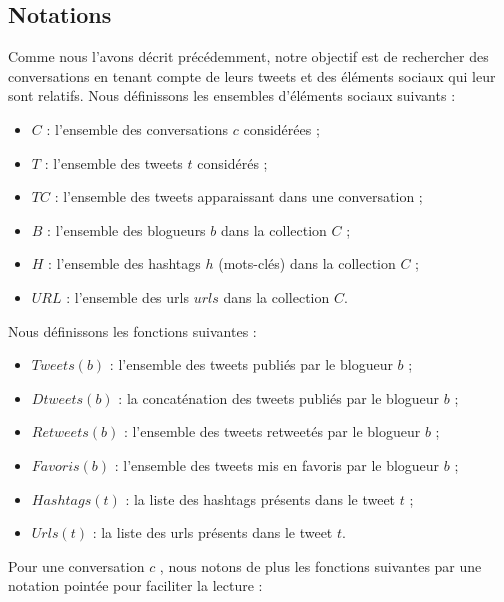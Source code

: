 \documentclass{article-hermes}
\begin{document}
\subsection{Notations}
Comme nous l'avons décrit précédemment, notre objectif est de rechercher des conversations en tenant compte de leurs tweets et des éléments sociaux qui leur sont relatifs. Nous définissons les ensembles d'éléments sociaux suivants :
\begin{itemize}
\item $C $ : l'ensemble des conversations $c$ considérées ;
\item $T$ : l'ensemble des tweets $t$ considérés ;
\item $TC$ : l'ensemble des tweets apparaissant dans une conversation ;
\item $B$ : l'ensemble des blogueurs $b$ dans la collection $C$ ;
\item $H$ : l'ensemble des hashtags $h$ (mots-clés) dans la collection $C$ ;
\item $URL$ : l'ensemble des urls $urls$ dans la collection $C$.
\end{itemize}
Nous définissons les fonctions suivantes :
\begin{itemize}
\item $Tweets(b)$ : l'ensemble des tweets publiés par le blogueur $b$ ;
\item $Dtweets(b)$ : la concaténation des tweets publiés par le blogueur $b$ ;
\item $Retweets(b)$ : l'ensemble des tweets retweetés par le blogueur $b$ ;
\item $Favoris(b)$ : l'ensemble des tweets mis en favoris par le blogueur $b$ ;
\item $Hashtags(t)$ : la liste des hashtags présents dans le tweet $t$ ;
\item $Urls(t)$ : la liste des urls présents dans le tweet  $t$.
\end{itemize}
\par Pour une conversation $c$ , nous notons de plus les fonctions suivantes par une notation pointée pour faciliter la lecture :
\end{document}
